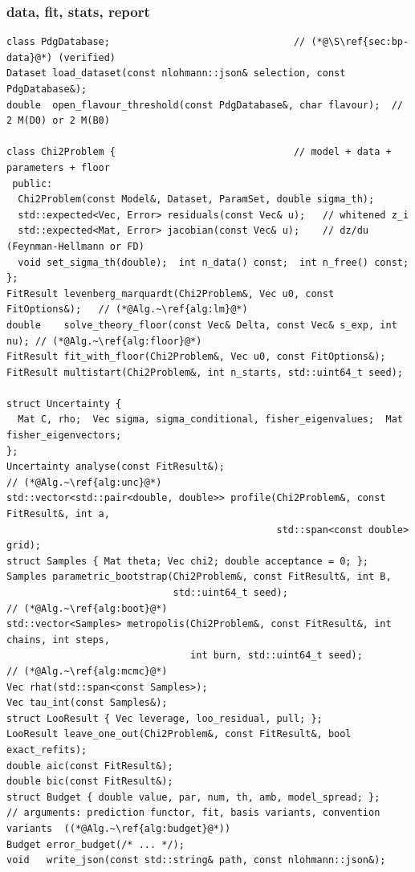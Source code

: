 \documentclass[11pt,a4paper]{article}
\numberwithin{equation}{section}
\theoremstyle{definition}
\theoremstyle{plain}
\theoremstyle{remark}
\numberwithin{algorithm}{section}
\begin{document}
\subsubsection*{data, fit, stats, report}
\begin{lstlisting}[style=cpp]
class PdgDatabase;                                // (*@\S\ref{sec:bp-data}@*) (verified)
Dataset load_dataset(const nlohmann::json& selection, const PdgDatabase&);
double  open_flavour_threshold(const PdgDatabase&, char flavour);  // 2 M(D0) or 2 M(B0)

class Chi2Problem {                               // model + data + parameters + floor
 public:
  Chi2Problem(const Model&, Dataset, ParamSet, double sigma_th);
  std::expected<Vec, Error> residuals(const Vec& u);   // whitened z_i
  std::expected<Mat, Error> jacobian(const Vec& u);    // dz/du (Feynman-Hellmann or FD)
  void set_sigma_th(double);  int n_data() const;  int n_free() const;
};
FitResult levenberg_marquardt(Chi2Problem&, Vec u0, const FitOptions&);   // (*@Alg.~\ref{alg:lm}@*)
double    solve_theory_floor(const Vec& Delta, const Vec& s_exp, int nu); // (*@Alg.~\ref{alg:floor}@*)
FitResult fit_with_floor(Chi2Problem&, Vec u0, const FitOptions&);
FitResult multistart(Chi2Problem&, int n_starts, std::uint64_t seed);

struct Uncertainty {
  Mat C, rho;  Vec sigma, sigma_conditional, fisher_eigenvalues;  Mat fisher_eigenvectors;
};
Uncertainty analyse(const FitResult&);                                    // (*@Alg.~\ref{alg:unc}@*)
std::vector<std::pair<double, double>> profile(Chi2Problem&, const FitResult&, int a,
                                               std::span<const double> grid);
struct Samples { Mat theta; Vec chi2; double acceptance = 0; };
Samples parametric_bootstrap(Chi2Problem&, const FitResult&, int B,
                             std::uint64_t seed);                         // (*@Alg.~\ref{alg:boot}@*)
std::vector<Samples> metropolis(Chi2Problem&, const FitResult&, int chains, int steps,
                                int burn, std::uint64_t seed);            // (*@Alg.~\ref{alg:mcmc}@*)
Vec rhat(std::span<const Samples>);
Vec tau_int(const Samples&);
struct LooResult { Vec leverage, loo_residual, pull; };
LooResult leave_one_out(Chi2Problem&, const FitResult&, bool exact_refits);
double aic(const FitResult&);
double bic(const FitResult&);
struct Budget { double value, par, num, th, amb, model_spread; };
// arguments: prediction functor, fit, basis variants, convention variants  ((*@Alg.~\ref{alg:budget}@*))
Budget error_budget(/* ... */);
void   write_json(const std::string& path, const nlohmann::json&);
\end{lstlisting}
\end{document}
